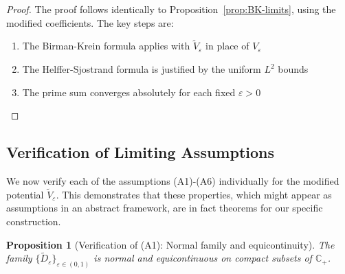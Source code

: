﻿\documentclass[12pt,a4paper]{article}
\newtheorem{proposition}[theorem]{Proposition}
\theoremstyle{definition}
\theoremstyle{remark}
\newcommand{\CC}{\mathbb{C}}
\begin{document}
\begin{proof}
The proof follows identically to Proposition~\ref{prop:BK-limits}, using the modified coefficients. The key steps are:
\begin{enumerate}
\item The Birman-Krein formula applies with $\widetilde{V}_\varepsilon$ in place of $V_\varepsilon$
\item The Helffer-Sjostrand formula is justified by the uniform $L^2$ bounds
\item The prime sum converges absolutely for each fixed $\varepsilon > 0$
\end{enumerate}
\end{proof}

\subsection{Verification of Limiting Assumptions}

We now verify each of the assumptions (A1)-(A6) individually for the modified potential $\widetilde{V}_\varepsilon$. This demonstrates that these properties, which might appear as assumptions in an abstract framework, are in fact theorems for our specific construction.

\begin{proposition}[Verification of (A1): Normal family and equicontinuity]\label{prop:verify-A1}
The family $\{\widetilde{D}_\varepsilon\}_{\varepsilon \in (0,1)}$ is normal and equicontinuous on compact subsets of $\CC_+$.
\end{proposition}
\end{document}
